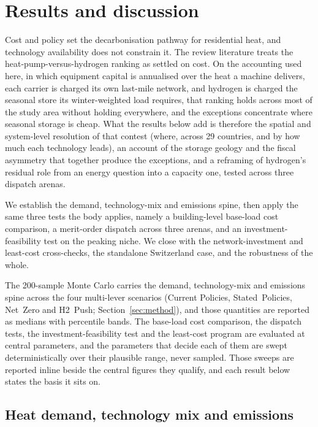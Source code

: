 \section{Results and discussion}
\label{sec:results}

 Cost and policy set the decarbonisation pathway for residential heat, and technology availability does not constrain it. The review literature treats the
heat-pump-versus-hydrogen ranking as settled on cost. On the accounting used here,
in which equipment capital is annualised over the heat a machine delivers, each
carrier is charged its own last-mile network, and hydrogen is charged the seasonal
store its winter-weighted load requires, that ranking holds across most of the study
area without holding everywhere, and the exceptions concentrate where seasonal storage
is cheap. What the results below add is therefore the spatial and system-level
resolution of that contest (where, across 29 countries, and by how much each technology
leads), an account of the storage geology and the fiscal asymmetry that together
produce the exceptions, and a reframing of hydrogen's
residual role from an energy question into a capacity one, tested across three
dispatch arenas.

We establish the demand, technology-mix and emissions spine, then apply the same three
tests the body applies, namely a building-level base-load cost comparison, a merit-order
dispatch across three arenas, and an investment-feasibility test on the peaking niche.
We close with the network-investment and least-cost cross-checks, the standalone
Switzerland case, and the robustness of the whole.

The 200-sample Monte Carlo carries the demand,
technology-mix and emissions spine across the four multi-lever scenarios (Current
Policies, Stated~Policies, Net~Zero and H2~Push; Section~\ref{sec:method}), and those
quantities are reported as medians with percentile bands. The base-load cost
comparison, the dispatch tests, the investment-feasibility test and the least-cost
program are evaluated at central parameters, and the parameters that decide each of
them are swept deterministically over their plausible range, never sampled. Those
sweeps are reported inline beside the central figures they qualify, and each result
below states the basis it sits on.

\subsection{Heat demand, technology mix and emissions}
\label{sec:results:spine}

